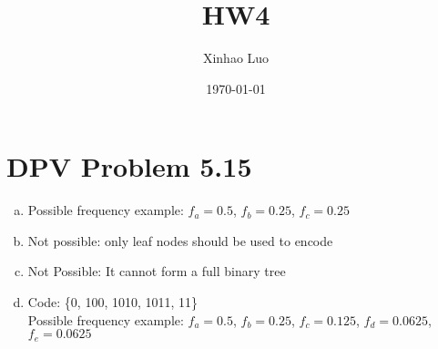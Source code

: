 \documentclass{article}
\title{HW4}
\author{Xinhao Luo}
\date{\today}
\begin{document}
\maketitle

\section{DPV  Problem  5.15}
\begin{enumerate}[a)]
    \item Possible frequency example: $f_a = 0.5$, $f_b = 0.25$, $f_c = 0.25$
    \item Not possible: only leaf nodes should be used to encode 
    \item Not Possible: It cannot form a full binary tree
    \item Code: \{0, 100, 1010, 1011, 11\} \\
         Possible frequency example: $f_a = 0.5$, $f_b = 0.25$, $f_c = 0.125$, $f_d = 0.0625$, $f_e = 0.0625$
\end{enumerate}
  
\end{document}
